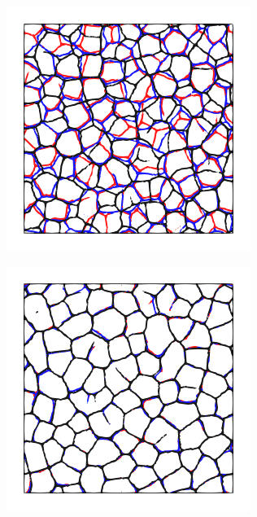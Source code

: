 
\begin{figure}[!htbp]
  \centering
  \begin{subfigure}[b]{0.4\textwidth}
    \includegraphics[width=\textwidth]{Chapter4/figures/2D/psic_constant.png}
    \caption{}
    \label{fig: Chapter4/2D/morphology_psic_constant}
  \end{subfigure}
  \begin{subfigure}[b]{0.4\textwidth}
    \includegraphics[width=\textwidth]{Chapter4/figures/2D/Gc_constant.png}

\end{subfigure}
\end{figure}
